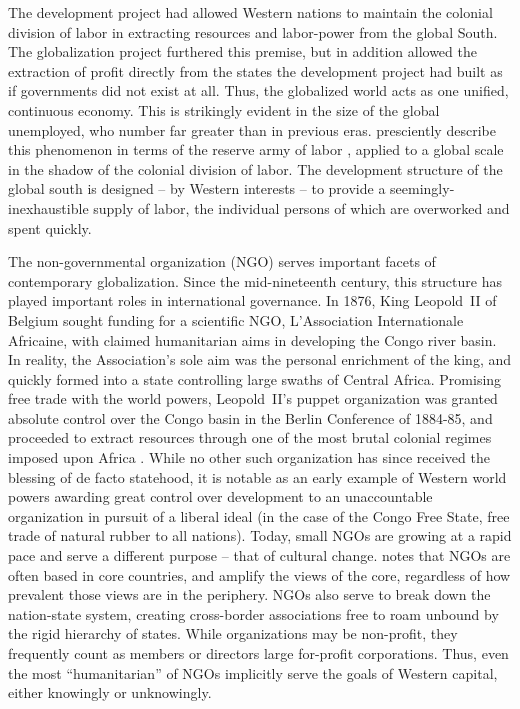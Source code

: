 \documentclass[american]{../../../coursework}
\begin{document}
The development project had allowed Western nations to maintain the colonial
division of labor in extracting resources and labor-power from the global
South. The globalization project furthered this premise, but in addition
allowed the extraction of profit directly from the states the development
project had built as if governments did not exist at all. Thus, the globalized
world acts as one unified, continuous economy. This is strikingly evident in
the size of the global unemployed, who number far greater than in previous
eras. \textcite{Frobel1976} presciently describe this phenomenon in terms of
the reserve army of labor \parencite[see][ch.\ 25.2]{Marx1887}, applied to a
global scale in the shadow of the colonial division of labor. The development
structure of the global south is designed -- by Western interests -- to
provide a seemingly-inexhaustible supply of labor, the individual persons of
which are overworked and spent quickly.

The non-governmental organization (NGO) serves important facets of
contemporary globalization. Since the mid-nineteenth century, this structure
has played important roles in international governance. In 1876, King
Leopold~II of Belgium sought funding for a scientific NGO, L'Association
Internationale Africaine, with claimed humanitarian aims in developing the
Congo river basin. In reality, the Association's sole aim was the personal
enrichment of the king, and quickly formed into a state controlling large
swaths of Central Africa. Promising free trade with the world powers,
Leopold~II's puppet organization was granted absolute control over the Congo
basin in the Berlin Conference of 1884-85, and proceeded to extract resources
through one of the most brutal colonial regimes imposed upon Africa
\parencites{Sayre1919}[see also][]{Charnovitz1997}. While no other such
organization has since received the blessing of de facto statehood, it is
notable as an early example of Western world powers awarding great control
over development to an unaccountable organization in pursuit of a liberal
ideal (in the case of the Congo Free State, free trade of natural rubber to
all nations). Today, small NGOs are growing at a rapid pace and serve a
different purpose -- that of cultural change. \textcite{Charnovitz1997} notes
that NGOs are often based in core countries, and amplify the views of the
core, regardless of how prevalent those views are in the periphery.
NGOs also serve to break down the nation-state system, creating cross-border
associations free to roam unbound by the rigid hierarchy of states.
While organizations may be non-profit, they frequently count as members or
directors large for-profit corporations. Thus, even the most ``humanitarian''
of NGOs implicitly serve the goals of Western capital, either knowingly or
unknowingly.
\end{document}
